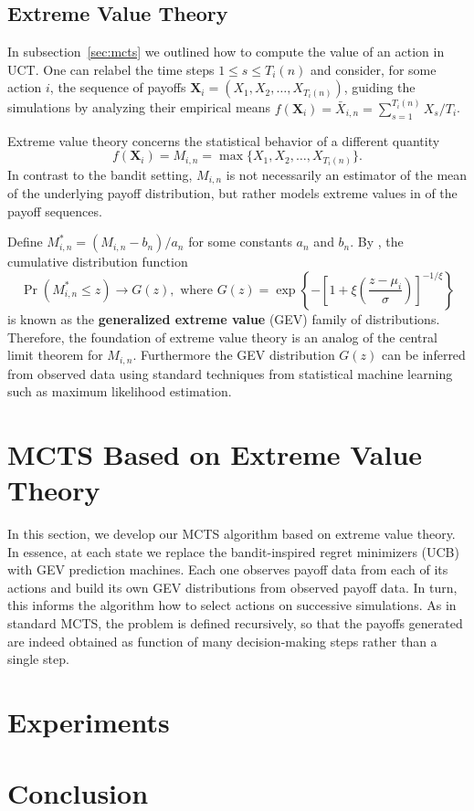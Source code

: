 \documentclass[runningheads,a4paper]{llncs}
\begin{document}
\subsection{Extreme Value Theory}
\label{sec:evt}

In subsection~\ref{sec:mcts} we outlined how to compute the value of an action in UCT. 
One can relabel the time steps $1 \le s \le T_i(n)$ and consider, for some action $i$, the sequence of payoffs $\mathbf{X}_i = (X_1, X_2, \ldots, X_{T_i(n)})$, 
guiding the simulations by analyzing their empirical means $f(\mathbf{X}_i) = \bar{X}_{i,n} = \sum_{s = 1}^{T_i(n)} X_s / T_i$.

Extreme value theory concerns the statistical behavior of a different quantity
\[ f(\mathbf{X}_i) = M_{i,n} = \max\{ X_1, X_2, \ldots, X_{T_i(n)} \}. \] 
In contrast to the bandit setting, $M_{i,n}$ is not necessarily an estimator of the mean of the 
underlying payoff distribution, but rather models extreme values in of the payoff sequences. 

Define $M^*_{i,n} = (M_{i,n} - b_n)/a_n$ for some constants $a_n$ and $b_n$. 
By \cite[Theorem 3.1.1]{Coles01Introduction}, the cumulative distribution function
\[
\Pr(M^*_{i,n} \le z) \rightarrow G(z), \mbox{ where } 
G(z) = \exp \left\{ - \left[ 1 + \xi \left(\frac{z - \mu_i}{\sigma}\right) \right]^{-1/\xi} \right\}
\]
is known as the {\bf generalized extreme value} (GEV) family of distributions. Therefore, the foundation of extreme value theory 
is an analog of the central limit theorem for $M_{i,n}$. 
Furthermore the GEV distribution $G(z)$ can be inferred from observed data using standard techniques from 
statistical machine learning such as maximum likelihood estimation. 

\section{MCTS Based on Extreme Value Theory}

In this section, we develop our MCTS algorithm based on extreme value theory. In essence, at each state we replace the bandit-inspired regret 
minimizers (UCB) with GEV prediction machines. Each one observes payoff data from each of its actions and build its own GEV distributions 
from observed payoff data. In turn, this informs the algorithm how to select actions on successive simulations. 
As in standard MCTS, the problem is defined recursively, so that the payoffs generated are indeed 
obtained as function of many decision-making steps rather than a single step.  

\section{Experiments}

\section{Conclusion}






\end{document}
